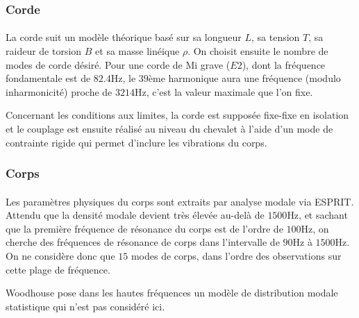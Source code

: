 \subsubsection{Corde}
  \paragraph{}
  
  La corde suit un modèle théorique basé sur sa longueur \( L \), sa tension
\( T \), sa raideur de torsion \( B \) et sa masse linéique \( \rho{} \).
  On choisit ensuite le nombre de modes de corde désiré.
  Pour une corde de Mi grave (\( E2 \)), dont la fréquence fondamentale est
de \( \si{82.4 \hertz}\), le \( 39 \)ème harmonique aura une fréquence (modulo 
inharmonicité) proche de \( \si{3214\hertz} \), c'est la valeur maximale que
l'on fixe.

  Concernant les conditions aux limites, la corde est supposée fixe-fixe
en isolation et le couplage est ensuite réalisé au niveau du chevalet à l'aide
d'un mode de contrainte rigide qui permet d'inclure les vibrations du corps.

\subsubsection{Corps}

  \paragraph{}
  Les paramètres physiques du corps sont extraits par analyse modale via ESPRIT.
Attendu que la densité modale devient très élevée au-delà de \( \si{1500\Hz} \),
et sachant que la première fréquence de résonance du corps est de l'ordre de
\( \si{100\Hz} \), on cherche des fréquences de résonance de corps dans
l'intervalle de \( \si{90\Hz} \) à \( \si{1500\Hz} \).
On ne considère donc que \( 15 \) modes de corps, dans l'ordre des observations
sur cette plage de fréquence.

Woodhouse pose dans les hautes fréquences un modèle de distribution modale
statistique qui n'est pas considéré ici.

    
